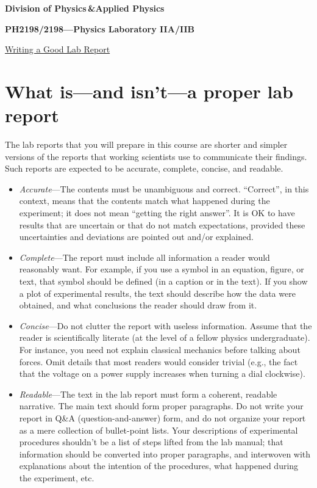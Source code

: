 \documentclass[11pt,a4paper]{article}
\begin{document}
\begin{center}
\textbf{Division of Physics\;\,\&\;Applied Physics}

\textbf{PH2198/2198---Physics Laboratory IIA/IIB}

\vskip 0.05in

\underline{\Huge Writing a Good Lab Report}
\end{center}

\section{What is---and isn't---a proper lab report}

The lab reports that you will prepare in this course are shorter and
simpler versions of the reports that working scientists use to
communicate their findings.  Such reports are expected to be accurate,
complete, concise, and readable.

\begin{itemize}
\item \textit{Accurate}---The contents must be unambiguous and
  correct.  ``Correct'', in this context, means that the contents
  match what happened during the experiment; it does not mean
  ``getting the right answer''.  It is OK to have results that are
  uncertain or that do not match expectations, provided these
  uncertainties and deviations are pointed out and/or explained.

\item \textit{Complete}---The report must include all information a
  reader would reasonably want.  For example, if you use a symbol in
  an equation, figure, or text, that symbol should be defined (in a
  caption or in the text).  If you show a plot of experimental
  results, the text should describe how the data were obtained, and
  what conclusions the reader should draw from it.

\item \textit{Concise}---Do not clutter the report with useless
  information.  Assume that the reader is scientifically literate (at
  the level of a fellow physics undergraduate).  For instance, you
  need not explain classical mechanics before talking about forces.
  Omit details that most readers would consider trivial (e.g., the
  fact that the voltage on a power supply increases when turning a
  dial clockwise).

\item \textit{Readable}---The text in the lab report must form a
  coherent, readable narrative.  The main text should form proper
  paragraphs.  Do not write your report in Q\&A (question-and-answer)
  form, and do not organize your report as a mere collection of
  bullet-point lists.  Your descriptions of experimental procedures
  shouldn't be a list of steps lifted from the lab manual; that
  information should be converted into proper paragraphs, and
  interwoven with explanations about the intention of the procedures,
  what happened during the experiment, etc.
\end{itemize}
\end{document}
